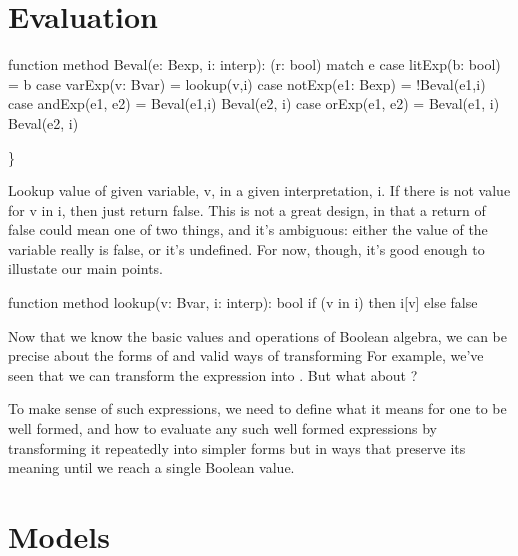 \documentclass[letterpaper,10pt,english]{sphinxmanual}
\begin{document}
\section{Evaluation}
\label{\detokenize{08-propositional-logic:evaluation}}
\begin{sphinxVerbatim}[commandchars=\\\{\}]
function method Beval(e: Bexp, i: interp): (r: bool)
\PYGZob{}
    match e
    \PYGZob{}
        case litExp(b: bool) =\PYGZgt{} b
        case varExp(v: Bvar) =\PYGZgt{} lookup(v,i)
        case notExp(e1: Bexp) =\PYGZgt{} !Beval(e1,i)
        case andExp(e1, e2) =\PYGZgt{} Beval(e1,i) \PYGZam{}\PYGZam{} Beval(e2, i)
        case orExp(e1, e2) =\PYGZgt{}  Beval(e1, i) \textbar{}\textbar{} Beval(e2, i)
    \PYGZcb{}
\PYGZcb{}
\end{sphinxVerbatim}

\}

Lookup value of given variable, v, in a given interpretation, i. If
there is not value for v in i, then just return false. This is not a
great design, in that a return of false could mean one of two things,
and it’s ambiguous: either the value of the variable really is false,
or it’s undefined.  For now, though, it’s good enough to illustate our
main points.

\begin{sphinxVerbatim}[commandchars=\\\{\}]
function method lookup(v: Bvar, i: interp): bool
\PYGZob{}
    if (v in i) then i[v]
    else false
\PYGZcb{}
\end{sphinxVerbatim}

Now that we know the basic values and operations of Boolean algebra,
we can be precise about the forms of and valid ways of transforming
 For example, we’ve seen that we can transform
the expression  into . But what about ?

To make sense of such expressions, we need to define what it means for
one to be well formed, and how to evaluate any such well formed
expressions by transforming it repeatedly into simpler forms but in
ways that preserve its meaning until we reach a single Boolean value.


\section{Models}
\label{\detokenize{08-propositional-logic:models}}
\end{document}
